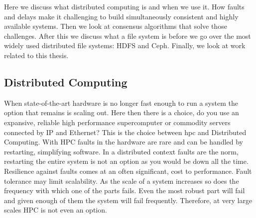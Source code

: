 Here we discuss what distributed computing is and when we use it. How faults and delays make it challenging to build simultaneously consistent and highly available systems. Then we look at consensus algorithms that solve those challenges. After this we discuss what a file system is before we go over the most widely used distributed file systems: HDFS and Ceph. Finally, we look at work related to this thesis.

\subsection{Distributed Computing}
When state-of-the-art hardware is no longer fast enough to run a system the option that remains is scaling out. Here then there is a choice, do you use an expansive, reliable high performance supercomputer or commodity servers connected by IP and Ethernet? This is the choice between \acf{hpc} and Distributed Computing. With HPC faults in the hardware are rare and can be handled by restarting, simplifying software. In a distributed context faults are the norm, restarting the entire system is not an option as you would be down all the time. Resilience against faults comes at an often significant, cost to performance. Fault tolerance may limit scalability. As the scale of a system increases so does the frequency with which one of the parts fails. Even the most robust part will fail and given enough of them the system will fail frequently. Therefore, at very large scales HPC is not even an option. 
